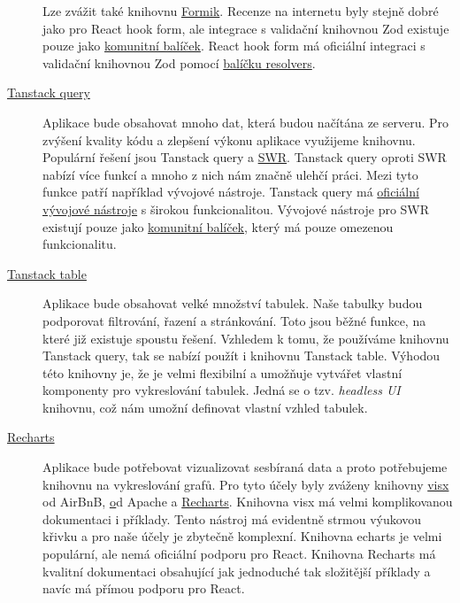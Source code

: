 \begin{description}
    Lze zvážit také knihovnu \href{https://formik.org}{Formik}.
    Recenze na internetu byly stejně dobré jako pro React hook form, ale integrace s validační knihovnou Zod existuje pouze jako \href{https://github.com/robertLichtnow/zod-formik-adapter}{komunitní balíček}.
    React hook form má oficiální integraci s validační knihovnou Zod pomocí \href{https://github.com/react-hook-form/resolvers}{balíčku resolvers}.
    \item[\href{https://tanstack.com/query/latest}{Tanstack query}]
    Aplikace bude obsahovat mnoho dat, která budou načítána ze serveru.
    Pro zvýšení kvality kódu a zlepšení výkonu aplikace využijeme knihovnu.
    Populární řešení jsou Tanstack query a \href{https://swr.vercel.app/}{SWR}\@.
    Tanstack query oproti SWR nabízí více funkcí a mnoho z nich nám značně ulehčí práci.
    Mezi tyto funkce patří například vývojové nástroje.
    Tanstack query má \href{https://tanstack.com/query/v4/docs/react/devtools}{oficiální vývojové nástroje} s širokou funkcionalitou.
    Vývojové nástroje pro SWR existují pouze jako \href{https://github.com/koba04/swr-devtools}{komunitní balíček}, který má pouze omezenou funkcionalitu.
    \item[\href{https://tanstack.com/table/v8}{Tanstack table}]
    Aplikace bude obsahovat velké množství tabulek.
    Naše tabulky budou podporovat filtrování, řazení a stránkování.
    Toto jsou běžné funkce, na které již existuje spoustu řešení.
    Vzhledem k tomu, že používáme knihovnu Tanstack query, tak se nabízí použít i knihovnu Tanstack table.
    Výhodou této knihovny je, že je velmi flexibilní a umožňuje vytvářet vlastní komponenty pro vykreslování tabulek.
    Jedná se o tzv. \textit{headless UI} knihovnu, což nám umožní definovat vlastní vzhled tabulek.
    \item[\href{https://recharts.org/en-US/}{Recharts}]
    Aplikace bude potřebovat vizualizovat sesbíraná data a proto potřebujeme knihovnu na vykreslování grafů.
    Pro tyto účely byly zváženy knihovny \href{https://github.com/airbnb/visx}{visx} od AirBnB, \href{https://github.com/apache/echarts} od Apache a \href{https://github.com/recharts/recharts}{Recharts}.
    Knihovna visx má velmi komplikovanou dokumentaci i příklady.
    Tento nástroj má evidentně strmou výukovou křivku a pro naše účely je zbytečně komplexní.
    Knihovna echarts je velmi populární, ale nemá oficiální podporu pro React.
    Knihovna Recharts má kvalitní dokumentaci obsahující jak jednoduché tak složitější příklady a navíc má přímou podporu pro React.
\end{description}

